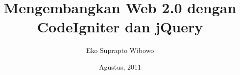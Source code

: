 \documentclass[11pt]{book}
\begin{document}
 

\author{Eko Suprapto Wibowo} 
\title{Mengembangkan Web 2.0 dengan CodeIgniter dan jQuery} 
\date{Agustus, 2011} 

\frontmatter 
\tableofcontents 
 

\mainmatter 

\backmatter 
 
 
\printindex %
\end{document}
